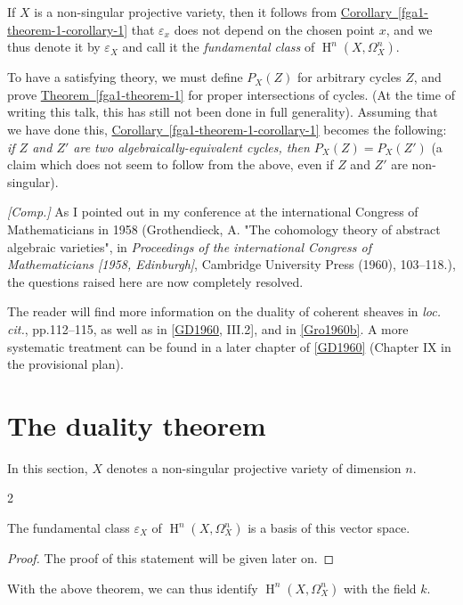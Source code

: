   If \(X\) is a non-singular projective variety, then it follows from \hyperref[fga1-theorem-1-corollary-1]{Corollary~\ref*{fga1-theorem-1-corollary-1}} that \(\varepsilon _x\) does not depend on the chosen point \(x\), and we thus denote it by \(\varepsilon _X\) and call it the \emph{fundamental class} of \(\operatorname {H}^n(X,\Omega _X^n)\).\begin{remark}{}\label{fga1-4-remark-i}\skipsinglepar\par{}To have a satisfying theory, we must define \(P_X(Z)\) for arbitrary cycles \(Z\), and prove \hyperref[fga1-theorem-1]{Theorem~\ref*{fga1-theorem-1}} for proper intersections of cycles.
    (At the time of writing this talk, this has still not been done in full generality).
    Assuming that we have done this, \hyperref[fga1-theorem-1-corollary-1]{Corollary~\ref*{fga1-theorem-1-corollary-1}} becomes the following:
    \emph{if \(Z\) and \(Z'\) are two algebraically-equivalent cycles, then \(P_X(Z)=P_X(Z')\)}
    (a claim which does not seem to follow from the above, even if \(Z\) and \(Z'\) are non-singular).\end{remark}\begin{remark}{}\label{fga1-4-remark-ii}\skipsinglepar\par{}\emph{[Comp.]}
    As I pointed out in my conference at the international Congress of Mathematicians in 1958 (Grothendieck, A. "The cohomology theory of abstract algebraic varieties", in \emph{Proceedings of the international Congress of Mathematicians [1958, Edinburgh]}, Cambridge University Press (1960), 103–118.), the questions raised here are now completely resolved.\par{}The reader will find more information on the duality of coherent sheaves in \emph{loc. cit.}, pp.112–115, as well as in [\hyperref[GD1960]{GD1960}, III.2], and in \hyperref[Gro1960b]{[Gro1960b]}.
    A more systematic treatment can be found in a later chapter of \hyperref[GD1960]{[GD1960]} (Chapter IX in the provisional plan).\end{remark}\chapter{The duality theorem}\thispagestyle{fancy}\label{fga1-5}\par{}In this section, \(X\) denotes a non-singular projective variety of dimension \(n\).\begin{theorem}{2}\label{fga1-theorem-2}\skipsinglepar\par{}The fundamental class \(\varepsilon _X\) of \(\operatorname {H}^n(X,\Omega _X^n)\) is a basis of this vector space.\begin{proof}\par{}The proof of this statement will be given later on.\end{proof}\end{theorem}\par{}With the above theorem, we can thus identify \(\operatorname {H}^n(X,\Omega _X^n)\) with the field \(k\).
  
